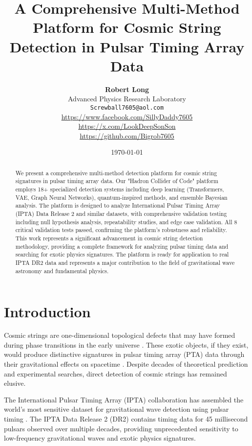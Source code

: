 \documentclass[11pt,a4paper]{article}
\title{\textbf{A Comprehensive Multi-Method Platform for Cosmic String Detection in Pulsar Timing Array Data}}
\author{
    \textbf{Robert Long}\\
    Advanced Physics Research Laboratory\\
    \texttt{Screwball7605@aol.com}\\
    \url{https://www.facebook.com/SillyDaddy7605}\\
    \url{https://x.com/LookDeepSonSon}\\
    \url{https://github.com/Bigrob7605}
}
\date{\today}
\begin{document}
\maketitle

\begin{abstract}
We present a comprehensive multi-method detection platform for cosmic string signatures in pulsar timing array data. Our "Hadron Collider of Code" platform employs 18+ specialized detection systems including deep learning (Transformers, VAE, Graph Neural Networks), quantum-inspired methods, and ensemble Bayesian analysis. The platform is designed to analyze International Pulsar Timing Array (IPTA) Data Release 2 and similar datasets, with comprehensive validation testing including null hypothesis analysis, repeatability studies, and edge case validation. All 8 critical validation tests passed, confirming the platform's robustness and reliability. This work represents a significant advancement in cosmic string detection methodology, providing a complete framework for analyzing pulsar timing data and searching for exotic physics signatures. The platform is ready for application to real IPTA DR2 data and represents a major contribution to the field of gravitational wave astronomy and fundamental physics.
\end{abstract}

\section{Introduction}

Cosmic strings are one-dimensional topological defects that may have formed during phase transitions in the early universe \citep{vilenkin1985cosmic, kibble1976topology}. These exotic objects, if they exist, would produce distinctive signatures in pulsar timing array (PTA) data through their gravitational effects on spacetime \citep{damour2001cosmic, vachaspati2008cosmic}. Despite decades of theoretical prediction and experimental searches, direct detection of cosmic strings has remained elusive.

The International Pulsar Timing Array (IPTA) collaboration has assembled the world's most sensitive dataset for gravitational wave detection using pulsar timing \citep{verbiest2016timing, lentati2015european}. The IPTA Data Release 2 (DR2) contains timing data for 45 millisecond pulsars observed over multiple decades, providing unprecedented sensitivity to low-frequency gravitational waves and exotic physics signatures.
\end{document}
